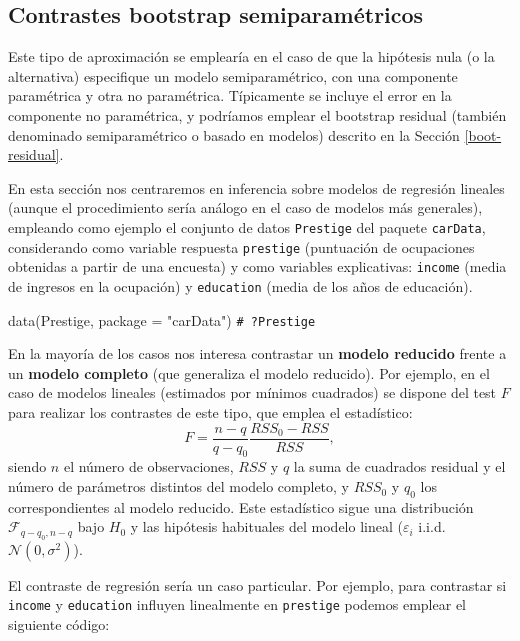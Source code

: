 \documentclass[
  10pt,
]{book}
\newenvironment{Shaded}{\begin{snugshade}}{\end{snugshade}}
\newcommand{\AttributeTok}[1]{\textcolor[rgb]{0.77,0.63,0.00}{#1}}
\newcommand{\CommentTok}[1]{\textcolor[rgb]{0.56,0.35,0.01}{\textit{#1}}}
\newcommand{\FunctionTok}[1]{\textcolor[rgb]{0.00,0.00,0.00}{#1}}
\newcommand{\NormalTok}[1]{#1}
\newcommand{\StringTok}[1]{\textcolor[rgb]{0.31,0.60,0.02}{#1}}
\theoremstyle{break}
\theoremstyle{nonumberplain}
\renewcommand{\CommentTok}[1]{\textcolor[rgb]{0.41,0.41,0.41}{\texttt{#1}}}
\begin{document}
\hypertarget{contrastes-semiparametricos}{%
\subsection{Contrastes bootstrap semiparamétricos}\label{contrastes-semiparametricos}}

Este tipo de aproximación se emplearía en el caso de que la hipótesis nula
(o la alternativa) especifique un modelo semiparamétrico,
con una componente paramétrica y otra no paramétrica.
Típicamente se incluye el error en la componente no paramétrica, y podríamos emplear
el bootstrap residual (también denominado semiparamétrico o basado en modelos)
descrito en la Sección \ref{boot-residual}.

En esta sección nos centraremos en inferencia sobre modelos de regresión lineales (aunque el procedimiento sería análogo en el caso de modelos más generales), empleando como ejemplo el conjunto de datos \texttt{Prestige} del paquete \texttt{carData}, considerando como variable respuesta \texttt{prestige} (puntuación de ocupaciones obtenidas a partir de una encuesta) y como variables explicativas: \texttt{income} (media de ingresos en la ocupación) y \texttt{education} (media de los años de educación).

\begin{Shaded}
\begin{Highlighting}[]
\FunctionTok{data}\NormalTok{(Prestige, }\AttributeTok{package =} \StringTok{"carData"}\NormalTok{)}
\CommentTok{\# ?Prestige}
\end{Highlighting}
\end{Shaded}

En la mayoría de los casos nos interesa contrastar un \textbf{modelo reducido}
frente a un \textbf{modelo completo} (que generaliza el modelo reducido).
Por ejemplo, en el caso de modelos lineales (estimados por mínimos cuadrados)
se dispone del test \(F\) para realizar los contrastes de este tipo,
que emplea el estadístico:
\[F=\frac{n - q}{q - q_0}\frac{RSS_0 - RSS}{RSS},\]
siendo \(n\) el número de observaciones, \(RSS\) y \(q\) la suma de cuadrados residual y
el número de parámetros distintos del modelo completo,
y \(RSS_0\) y \(q_0\) los correspondientes al modelo reducido.
Este estadístico sigue una distribución \(\mathcal{F}_{q - q_0, n - q}\)
bajo \(H_0\) y las hipótesis habituales del modelo lineal
(\(\varepsilon_i\) i.i.d. \(\mathcal{N}(0, \sigma^2)\)).

El contraste de regresión sería un caso particular. Por ejemplo,
para contrastar si \texttt{income} y \texttt{education} influyen linealmente en \texttt{prestige}
podemos emplear el siguiente código:
\end{document}
